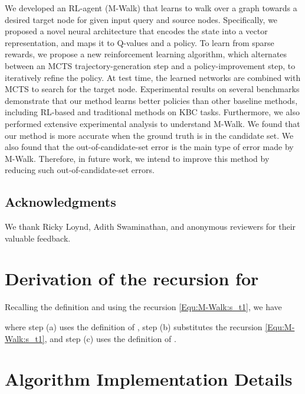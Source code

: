 \documentclass{article}
\newcommand{\modelname}{M-Walk}
\begin{document}
	We developed an RL-agent (\modelname) that learns to walk over a graph towards a desired target node for given input query and source nodes. Specifically, we proposed a novel neural architecture that encodes the state into a vector representation, and maps it to Q-values and a policy. To learn from sparse rewards, we propose a new reinforcement learning algorithm, which alternates between an MCTS trajectory-generation step and a policy-improvement step, to iteratively refine the policy. At test time, the learned networks are combined with MCTS to search for the target node. Experimental results on several benchmarks demonstrate that our method learns better policies than other baseline methods, including RL-based and traditional methods on KBC tasks. Furthermore, we also performed extensive experimental analysis to understand \modelname. We found that our method is more accurate when the ground truth is in the candidate set. We also found that the out-of-candidate-set error is the main type of error made by M-Walk. Therefore, in future work, we intend to improve this method by reducing such out-of-candidate-set errors.
	
\subsection*{Acknowledgments}
We thank Ricky Loynd, Adith Swaminathan, and anonymous reviewers for their valuable feedback.


	
	
	
	
\clearpage
	
	\appendix

\section{Derivation of the recursion for }
\label{Appendix:qt_derivation}

Recalling the definition  and using the recursion \eqref{Equ:\modelname:s_t1}, we have
    
where step (a) uses the definition of , step (b) substitutes the recursion \eqref{Equ:\modelname:s_t1}, and step (c) uses the definition of .


\section{Algorithm Implementation Details}
\label{Appendix:AlgDetails}
\end{document}
